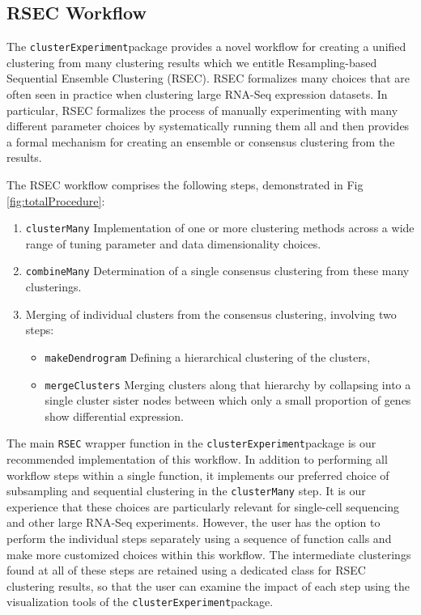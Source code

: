 \documentclass[10pt,letterpaper]{article}
\newcommand{\f}[1]{\texttt{#1}}
\newcommand{\CE}{\f{clusterExperiment}}
\begin{document}
\subsection{RSEC Workflow}

The \CE package provides a novel workflow for creating a unified clustering from many clustering results which we entitle Resampling-based Sequential Ensemble Clustering (RSEC). RSEC formalizes many choices that are often seen in practice when clustering large RNA-Seq expression datasets. In particular, RSEC formalizes the process of manually experimenting with many different parameter choices by systematically running them all and then provides a formal mechanism for creating an ensemble or consensus clustering from the results.

The RSEC workflow comprises the following steps, demonstrated in Fig \ref{fig:totalProcedure}:
\begin{enumerate}
	\item \f{clusterMany} Implementation of one or more clustering methods across a wide range of tuning parameter and data dimensionality choices. 	
    \item \f{combineMany} Determination of a single consensus clustering from these many clusterings.
	\item Merging of individual clusters from the consensus clustering, involving two steps:
	\begin{itemize}\item \f{makeDendrogram} Defining a hierarchical clustering of the clusters,
	\item \f{mergeClusters} Merging clusters along that hierarchy by collapsing into a single cluster sister nodes between which only a small proportion of genes show differential expression.
	\end{itemize}
\end{enumerate}

The main \f{RSEC} wrapper function in the \CE package is our recommended implementation of this workflow. In addition to performing all workflow steps within a single function, it implements our preferred choice of subsampling and sequential clustering in the \f{clusterMany} step. It is our experience that these choices are particularly relevant for single-cell sequencing and other large RNA-Seq experiments.  
However, the user has the option to perform the individual steps separately using a sequence of function calls and make more customized choices within this workflow. The intermediate clusterings found at all of these steps are retained using a dedicated class for RSEC clustering results, so that the user can examine the impact of each step using the visualization tools of the \CE package.
\end{document}
